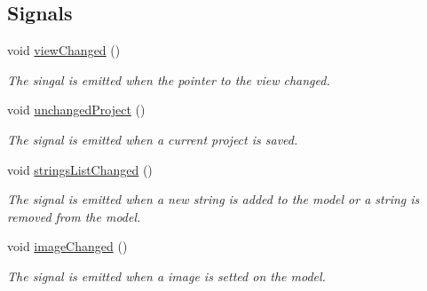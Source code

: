\subsection*{Signals}
\begin{DoxyCompactItemize}
\item 
\mbox{\label{classGuiController_a3bcaea6fb5694216afc69c4eca13b711}} 
void \mbox{\hyperlink{classGuiController_a3bcaea6fb5694216afc69c4eca13b711}{view\+Changed}} ()
\begin{DoxyCompactList}\small\item\em The singal is emitted when the pointer to the view changed. \end{DoxyCompactList}\item 
\mbox{\label{classGuiController_a916ef2ef2d8d7b9ac4e63ee746dcdaaa}} 
void \mbox{\hyperlink{classGuiController_a916ef2ef2d8d7b9ac4e63ee746dcdaaa}{unchanged\+Project}} ()
\begin{DoxyCompactList}\small\item\em The signal is emitted when a current project is saved. \end{DoxyCompactList}\item 
\mbox{\label{classGuiController_a20613f0b5eb1d49e4006a82ca80f17c5}} 
void \mbox{\hyperlink{classGuiController_a20613f0b5eb1d49e4006a82ca80f17c5}{strings\+List\+Changed}} ()
\begin{DoxyCompactList}\small\item\em The signal is emitted when a new string is added to the model or a string is removed from the model. \end{DoxyCompactList}\item 
\mbox{\label{classGuiController_a8e5b5cd2b34a4c86d2b95acd1359b86a}} 
void \mbox{\hyperlink{classGuiController_a8e5b5cd2b34a4c86d2b95acd1359b86a}{image\+Changed}} ()
\begin{DoxyCompactList}\small\item\em The signal is emitted when a image is setted on the model. \end{DoxyCompactList}\end{DoxyCompactItemize}
